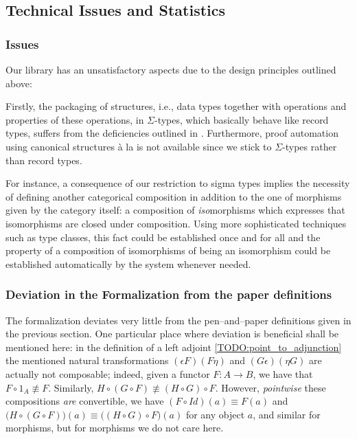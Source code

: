 \subsection*{Technical Issues and Statistics}


\subsubsection*{Issues}
Our library has an unsatisfactory aspects due to the design principles outlined above:

Firstly, the packaging of structures, i.e., data types together with operations and properties of these operations,
in $\Sigma$-types, which basically behave like record types,
suffers from the deficiencies outlined in \cite{DBLP:journals/mscs/SpittersW11}. Furthermore,
proof automation using canonical structures \`a la \cite{DBLP:conf/icfp/GonthierZND11} is not
available since we stick to $\Sigma$-types rather than record types.

For instance, a consequence of our restriction to sigma types implies the necessity of defining another
categorical composition in addition to the one of morphisms given by the category itself: a composition of
\emph{iso}morphisms which expresses that isomorphisms are closed under composition.
Using more sophisticated techniques such as type classes, this fact could be established once and for all and the property of
a composition of isomorphisms of being an isomorphism could be established automatically by the system whenever needed.


\subsubsection*{Deviation in the Formalization from the paper definitions}

The formalization deviates very little from the pen--and--paper definitions given in the previous section.
One particular place where deviation is beneficial shall be mentioned here:
in the definition of a left adjoint \ref{TODO:point_to_adjunction}
the mentioned natural transformations $(\epsilon F)(F\eta)$ and $(G\epsilon)(\eta G)$ are actually not
composable; indeed, given a functor $F : A \to B$, we have that $F \circ 1_A \not\equiv F$.
Similarly, $H \circ (G \circ F)\not \equiv (H\circ G)\circ F$. However, \emph{pointwise} these compositions
\emph{are} convertible, we have $(F \circ Id) (a) \equiv F(a)$ and
$\big(H \circ (G \circ F)\big)(a)\equiv \big((H\circ G)\circ F\big)(a)$ for any object $a$, and similar for morphisms, but for morphisms
we do not care here.

